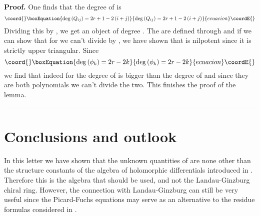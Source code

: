 \documentclass[a4paper,11pt]{article}
\newenvironment{proof}[1][Proof]{\textbf{#1.} }{\ \rule{0.5em}{0.5em}}
\numberwithin{equation}{section}
\begin{document}
\begin{proof}
One finds \cite{ITO-YANG:1998} that the degree of \coordHE{} is 
\begin{equation}\coord{}\boxEquation{
\deg \left( Q_{ij}\right) =2r+1-2\left( i+j\right) 
}{
\deg \left( Q_{ij}\right) =2r+1-2\left( i+j\right) 
}{ecuacion}\coordE{}\end{equation}
Dividing this by \coordHE{}, we get an object of degree \coordHE{}.
The \coordHE{} are defined through \myHighlight{$\left( \ref{D}\right) \ $}\coordHE{}and if we can
show that for \coordHE{} we can't divide \coordHE{} by \coordHE{},
we have shown that \coordHE{} is nilpotent since it is strictly upper
triangular. Since 
\begin{equation}\coord{}\boxEquation{
\deg \left( \phi _{k}\right) =2r-2k
}{
\deg \left( \phi _{k}\right) =2r-2k
}{ecuacion}\coordE{}\end{equation}
we find that indeed for \coordHE{} the degree of \coordHE{} is bigger than
the degree of \coordHE{} and since they are both polynomials we
can't divide the two. This finishes the proof of the lemma.
\end{proof}

\section{Conclusions and outlook}

In this letter we have shown that the unknown quantities \coordHE{}
of \cite{ITO-YANG:1998} are none other than the structure constants of the
algebra of holomorphic differentials introduced in \cite{MARS-MIRO-MORO:2000}%
. Therefore this is the algebra that should be used, and not the
Landau-Ginzburg chiral ring. However, the connection with Landau-Ginzburg
can still be very useful since the Picard-Fuchs equations may serve as an
alternative to the residue formulas considered in \cite{MARS-MIRO-MORO:2000}.

\bigskip



\end{document}

